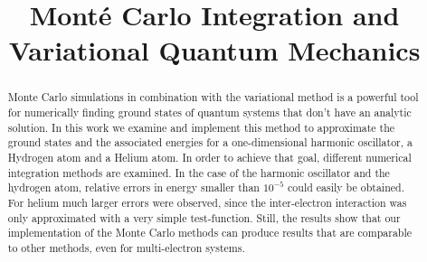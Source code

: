 \documentclass[conference]{IEEEtran}
\begin{document}
\title{Mont\'e Carlo Integration and Variational Quantum Mechanics}


\author{
\and
{}
\and
{}
}


\maketitle


\begin{abstract}

Monte Carlo simulations in combination with the variational method is a powerful tool for numerically finding ground states of quantum systems that don't have an analytic solution. In this work we examine and implement this method to approximate the ground states and the associated energies for a one-dimensional harmonic oscillator, a Hydrogen atom and a Helium atom. In order to achieve that goal, different numerical integration methods are examined. In the case of the harmonic oscillator and the hydrogen atom, relative errors in energy smaller than $10^{-5}$ could easily be obtained. For helium much larger errors were observed, since the inter-electron interaction was only approximated with a very simple test-function. Still, the results show that our implementation of the Monte Carlo methods can produce results that are comparable to other methods, even for multi-electron systems.


\end{abstract}

\IEEEpeerreviewmaketitle














\end{document}
